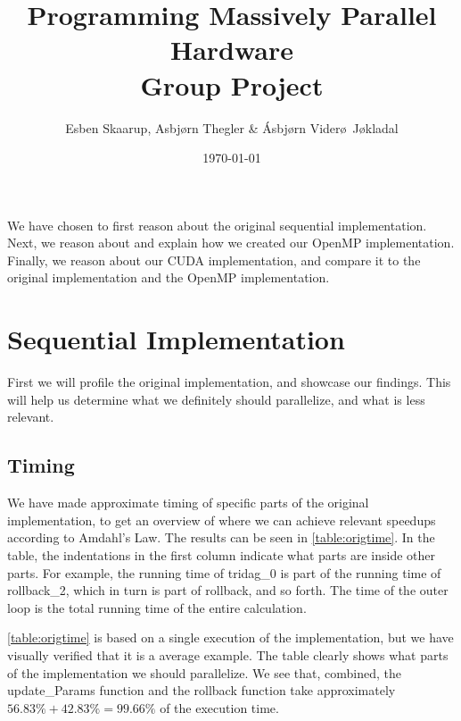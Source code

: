 \documentclass[11pt]{article}
\def\Title{Programming Massively Parallel Hardware\\
\vspace{1.5cm}
\textbf{Group Project}}
\def\Author{Esben Skaarup, Asbj\o rn Thegler \& \'{A}sbj\o rn Vider\o \ J\o kladal}
\begin{document}
\title{\Title}
\author{\Author}
\date{\today}
\maketitle

We have chosen to first reason about the original sequential implementation. 
Next, we reason about and explain how we created our OpenMP 
implementation. Finally, we reason about our CUDA implementation, and compare
it to the original implementation and the OpenMP implementation.

\section{Sequential Implementation}
First we will profile the original implementation, and showcase our findings.
This will help us determine what we definitely should parallelize, and what is
less relevant.

\subsection{Timing}
We have made approximate timing of specific parts of the original 
implementation, to get an overview 
of where we can achieve relevant speedups according to Amdahl's Law. The results
can be seen in \autoref{table:origtime}. In the table, the indentations 
in the first column indicate what parts are inside other parts. For example,
the running time of tridag\_0 is part of the running time of rollback\_2, which
in turn is part of rollback, and so forth. The time of the outer loop is the 
total running time of the entire calculation. 

\autoref{table:origtime} is based on a single execution of the implementation, 
but we have visually verified that it is a average example. 
The table clearly shows what parts of the implementation we should parallelize.
We see that, combined, the update\_Params function and the rollback function take approximately $56.83\%+42.83\%=99.66\%$ of the execution time.
\end{document}
